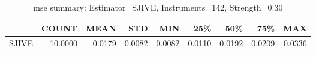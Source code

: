 \begin{table}[ht]
\centering
\caption{mse summary: Estimator=SJIVE, Instruments=142, Strength=0.30}
\begin{tabular}{lrrrrrrrr}
\toprule
 & COUNT & MEAN & STD & MIN & 25\% & 50\% & 75\% & MAX \\
\midrule
SJIVE & 10.0000 & 0.0179 & 0.0082 & 0.0082 & 0.0110 & 0.0192 & 0.0209 & 0.0336 \\
\bottomrule
\end{tabular}
\end{table}
